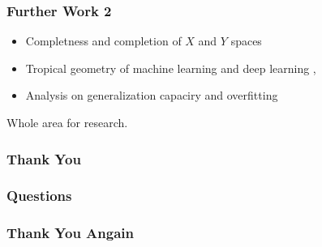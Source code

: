 \documentclass{beamer}
\begin{document}
\begin{frame}
    \frametitle{Further Work 2}
    \begin{itemize}
        \item Completness and completion of $X$ and $Y$ spaces
        \item Tropical geometry of machine learning and deep learning 
        \cite{MaragCharTheod}, \cite{ZhNaitLim}
        \item Analysis on generalization capaciry and overfitting
    \end{itemize}
    Whole area for research.
\end{frame}

\begin{frame}
    \frametitle{Thank You}
\end{frame}

\begin{frame}
    \frametitle{Questions}
\end{frame}

\begin{frame}
    \frametitle{Thank You Angain}
\end{frame}
\end{document}
